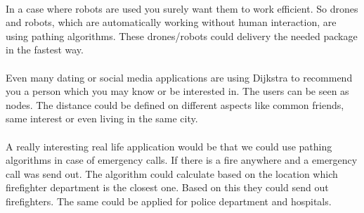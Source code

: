 \documentclass[a4paper,12pt]{article}
\begin{document}
\\In a case where robots are used you surely want them to work efficient. So drones and robots, which are automatically working without human interaction, are using pathing algorithms. These drones/robots could delivery the needed package in the fastest way.\\
\\Even many dating or social media applications are using Dijkstra to recommend you a person which you may know or be interested in. The users can be seen as nodes. The distance could be defined on different aspects like common friends, same interest or even living in the same city.\cite{geeksdijkstra}\\
\\A really interesting real life application would be that we could use pathing algorithms in case of emergency calls. If there is a fire anywhere and a emergency call was send out. The algorithm could calculate based on the location which firefighter department is the closest one. Based on this they could send out firefighters. The same could be applied for police department and hospitals.
\end{document}
